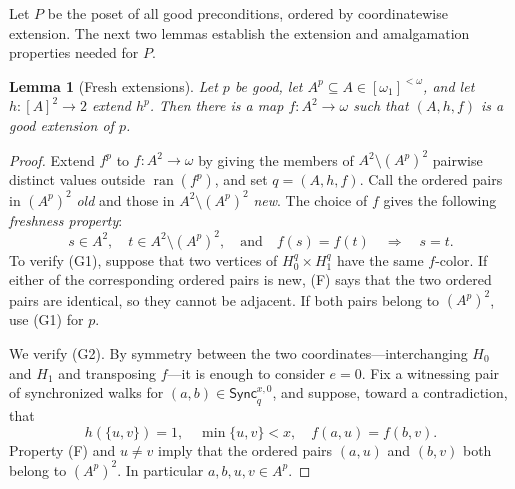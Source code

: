 \documentclass{amsart}
\numberwithin{equation}{section}
\newtheorem{lemma}[theorem]{Lemma}
\theoremstyle{definition}
\theoremstyle{remark}
\begin{document}
Let $P$ be the poset of all good preconditions, ordered by coordinatewise
extension.  The next two lemmas establish the extension and amalgamation
properties needed for $P$.

\begin{lemma}[Fresh extensions]\label{lem:fresh}
Let $p$ be good, let $A^p\subseteq A\in[\omega_1]^{<\omega}$, and
let $h:[A]^2\to2$ extend $h^p$.  Then there is a map
$f:A^2\to\omega$ such that $(A,h,f)$ is a good extension of $p$.
\end{lemma}

\begin{proof}
Extend $f^p$ to $f:A^2\to\omega$ by giving the members of
$A^2\setminus(A^p)^2$ pairwise distinct values outside
$\operatorname{ran}(f^p)$, and set $q=(A,h,f)$.  Call the ordered
pairs in $(A^p)^2$ \emph{old} and those in
$A^2\setminus(A^p)^2$ \emph{new}.  The choice of $f$ gives the
following \emph{freshness property}:
\begin{displaymath}
 s\in A^2,\quad t\in A^2\setminus(A^p)^2,
 \quad\text{and}\quad f(s)=f(t)
 \quad\Longrightarrow\quad s=t.                       \tag{F}
\end{displaymath}
To verify (G1), suppose that two
vertices of $H_0^q\times H_1^q$ have the same $f$-color.  If either of
the corresponding ordered pairs is new, (F) says
that the two ordered pairs are identical, so they cannot be adjacent.
If both pairs belong to $(A^p)^2$, use (G1) for $p$.

We verify (G2).  By symmetry between the two coordinates---interchanging
$H_0$ and $H_1$ and transposing $f$---it is enough to consider $e=0$.
Fix a witnessing pair of synchronized walks for
$(a,b)\in\mathsf{Sync}^{x,0}_q$, and suppose, toward a contradiction,
that
\begin{equation}\label{eq:fresh-g2-counterexample}
 h(\{u,v\})=1,\quad \min\{u,v\}<x,\quad
 f(a,u)=f(b,v).
\end{equation}
Property (F) and $u\ne v$ imply that the ordered pairs $(a,u)$ and
$(b,v)$ both belong to $(A^p)^2$.  In particular
$a,b,u,v\in A^p$.


\end{proof}
\end{document}
